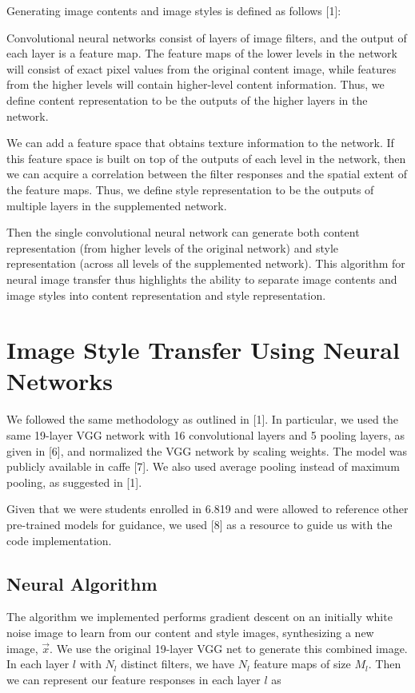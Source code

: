 \documentclass[10pt,twocolumn,letterpaper]{article}
\begin{document}
Generating image contents and image styles is defined as follows [1]:

Convolutional neural networks consist of layers of image filters, and the output of each layer is a feature map. The feature maps of the lower levels in the network will consist of exact pixel values from the original content image, while features from the higher levels will contain higher-level content information. Thus, we define content representation to be the outputs of the higher layers in the network.

We can add a feature space that obtains texture information to the network. If this feature space is built on top of the outputs of each level in the network, then we can acquire a correlation between the filter responses and the spatial extent of the feature maps. Thus, we define style representation to be the outputs of multiple layers in the supplemented network. 

Then the single convolutional neural network can generate both content representation (from higher levels of the original network) and style representation (across all levels of the supplemented network). This algorithm for neural image transfer thus highlights the ability to separate image contents and image styles into content representation and style representation. 

\section{Image Style Transfer Using Neural Networks}

We followed the same methodology as outlined in [1]. In particular, we used the same 19-layer VGG network with 16 convolutional layers and 5 pooling layers, as given in [6], and normalized the VGG network by scaling weights. The model was publicly available in caffe [7]. We also used average pooling instead of maximum pooling, as suggested in [1].

Given that we were students enrolled in 6.819 and were allowed to reference other pre-trained models for guidance, we used [8] as a resource to guide us with the code implementation.

\subsection{Neural Algorithm}

The algorithm we implemented performs gradient descent on an initially white noise image to learn from our content and style images, synthesizing a new image, $\vec{x}$. We use the original 19-layer VGG net to generate this combined image. In each layer $l$ with $N_l$ distinct filters, we have $N_l$ feature maps of size $M_l$. Then we can represent our feature responses in each layer $l$ as
\end{document}
